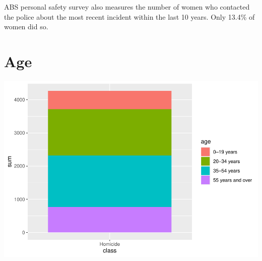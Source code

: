 \documentclass[11pt,a4paper,]{article}
\begin{document}
ABS personal safety survey also measures the number of women who contacted the police about the most recent incident within the last 10 years. Only 13.4\% of women did so.

\clearpage

\section*{Age}

\includegraphics{report_files/figure-latex/Homicide-1.pdf}
\end{document}
